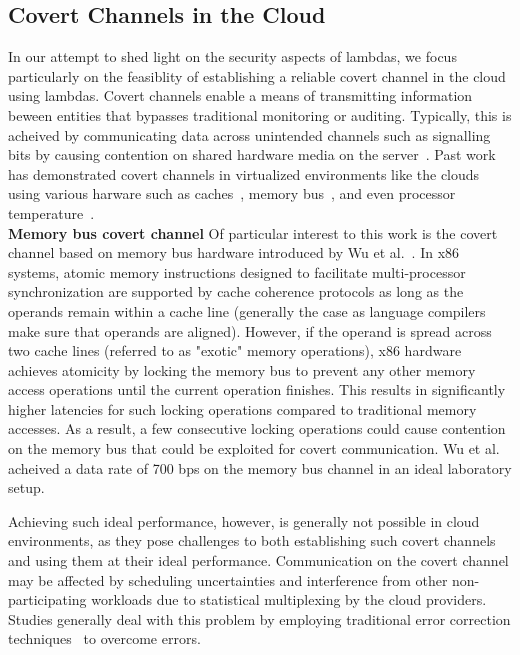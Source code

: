\subsection{Covert Channels in the Cloud}
\label{sec:background:covertchannels}
In our attempt to shed light on the security aspects of lambdas, we focus
particularly on the feasiblity of establishing a reliable covert channel in the
cloud using lambdas.  Covert channels enable a means of transmitting information
beween entities that bypasses traditional monitoring or auditing. Typically,
this is acheived by communicating data across unintended channels such as
signalling bits by causing contention on shared hardware media on the
server~\cite{L2cacheCovertChannels,
ProcessorCovertChannels,ThermalCovertChannel,SshOverCovertChannel,wuusenix2012}.
Past work has demonstrated covert channels in virtualized environments like the
clouds using various harware such as
caches~\cite{ristenpartccs2009,L2cacheCovertChannels}, memory
bus~\cite{wuusenix2012}, and even processor
temperature~\cite{ThermalCovertChannel}. \\

\noindent \textbf{Memory bus covert channel} 
Of particular interest to this work is the covert channel based on memory bus 
hardware introduced by Wu et al.~\cite{wuusenix2012}. 
In x86 systems, atomic memory instructions designed to facilitate 
multi-processor synchronization are supported by cache coherence protocols as
long as the operands remain within a cache line (generally the case as language
compilers make sure that operands are aligned). However, if the operand is
spread across two cache lines (referred to as "exotic" memory operations), x86
hardware achieves atomicity by locking the memory bus to prevent any other
memory access operations until the current operation finishes. This results in
significantly higher latencies for such locking operations compared to traditional 
memory accesses. As a result, a few consecutive locking operations could cause 
contention on the memory bus that could be exploited for covert communication.
Wu et al. acheived a data rate of 700 bps on the memory bus channel in an 
ideal laboratory setup.

Achieving such ideal performance, however, is generally not possible in cloud 
environments, as they pose challenges to both establishing such covert
channels and using them at their ideal performance. 
Communication on the covert channel may be affected by
scheduling uncertainties and interference from other non-participating
workloads due to statistical multiplexing by the cloud providers.  Studies
generally deal with this problem by employing traditional error correction
techniques~\cite{wuusenix2012} to overcome errors.  


